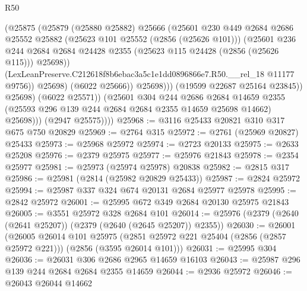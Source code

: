 \begin{lexlean}{R50}
\begin{coremodule}
                            (@25875
                              (@25879
                                (@25880 @25882)
                                @25666
                                (@25601
                                  @230
                                  @449
                                  @2684
                                  @2686
                                  @25552
                                  @25882
                                  (@25623 @101 @25552 (@2856 (@25626 @101)))
                                  (@25601
                                    @236
                                    @244
                                    @2684
                                    @2684
                                    @24428
                                    @2355
                                    (@25623 @115 @24428 (@2856 (@25626 @115)))
                                    @25698))
                                (LexLeanPreserve.C212618f8b6ebac3a5c1e1dd0896866e7.R50.__rel_18
                                  @11177
                                  @9756))
                              @25698)
                            (@6022 @25666))
                          @25698)))
                    (@19599 @22687 @25164 @23845))
                  @25698)
                (@6022 @25571))
              (@25601
                @304
                @244
                @2686
                @2684
                @14659
                @2355
                (@25593 @296 @139 @244 @2684 @2684 @2355 @14659 @25698 @14662)
                @25698)))
          (@2947 @25575))))
@25968 := @3116 @25433 @20821 @310 @317 @675 @750 @20829
@25969 := @2764 @315
@25972 := @2761 (@25969 @20827) @25433
@25973 := @25968 @25972
@25974 := @2723 @20133
@25975 := @2633 @25208
@25976 := @2379 @25975
@25977 := @25976 @21843
@25978 := @2354 @25977
@25981 := @25973 (@25974 @25978) @20838
@25982 := @2815 @317
@25986 := @25981 (@2814 (@25982 @20829 @25433))
@25987 := @2824 @25972
@25994 := @25987 @337 @324 @674 @20131 @2684 @25977 @25978
@25995 := @2842 @25972
@26001 := @25995 @672 @349 @2684 @20130 @25975 @21843
@26005 := @3551 @25972 @328 @2684 @101
@26014 := @25976 (@2379 (@2640 (@2641 @25207)) (@2379 (@2640 (@2645 @25207)) @2355))
@26030 := @26001
    (@26005
      @26014
      @101
      @25975
      (@2851 @25972 @221 @25404 (@2856 (@2857 @25972 @221)))
      (@2856 (@3595 @26014 @101)))
@26031 := @25995 @304
@26036 := @26031 @306 @2686 @2965 @14659 @16103
@26043 := @25987 @296 @139 @244 @2684 @2684 @2355 @14659
@26044 := @2936 @25972
@26046 := @26043 @26044 @14662

\end{coremodule}
\end{lexlean}
